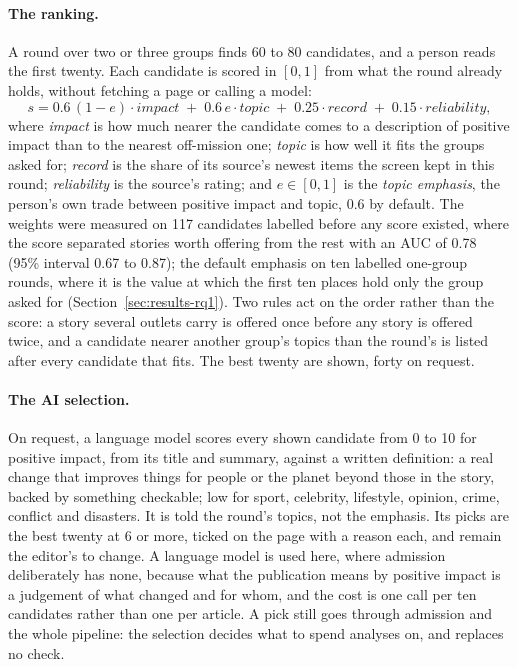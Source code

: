 \paragraph{The ranking.} A round over two or three groups finds 60 to
80 candidates, and a person reads the first twenty. Each candidate is
scored in $[0,1]$ from what the round already holds, without fetching a
page or calling a model:
\[
  s = 0.6\,(1-e)\cdot\textit{impact} \;+\; 0.6\,e\cdot\textit{topic}
      \;+\; 0.25\cdot\textit{record} \;+\; 0.15\cdot\textit{reliability},
\]
where \textit{impact} is how much nearer the candidate comes to a
description of positive impact than to the nearest off-mission one;
\textit{topic} is how well it fits the groups asked for;
\textit{record} is the share of its source's newest items the screen
kept in this round; \textit{reliability} is the source's rating; and
$e \in [0,1]$ is the \emph{topic emphasis}, the person's own trade
between positive impact and topic, 0.6 by default. The weights were
measured on 117 candidates labelled before any score existed, where the
score separated stories worth offering from the rest with an AUC of
0.78 (95\% interval 0.67 to 0.87); the default emphasis on ten labelled
one-group rounds, where it is the value at which the first ten places
hold only the group asked for (Section~\ref{sec:results-rq1}). Two
rules act on the order rather than the score: a story several outlets
carry is offered once before any story is offered twice, and a
candidate nearer another group's topics than the round's is listed
after every candidate that fits. The best twenty are shown, forty on
request.

\paragraph{The AI selection.} On request, a language model scores
every shown candidate from 0 to 10 for positive impact, from its title
and summary, against a written definition: a real change that improves
things for people or the planet beyond those in the story, backed by
something checkable; low for sport, celebrity, lifestyle, opinion,
crime, conflict and disasters. It is told the round's topics, not the
emphasis. Its picks are the best twenty at 6 or more, ticked on the
page with a reason each, and remain the editor's to change. A language
model is used here, where admission deliberately has none, because what
the publication means by positive impact is a judgement of what changed
and for whom, and the cost is one call per ten candidates rather than
one per article. A pick still goes through admission and the whole
pipeline: the selection decides what to spend analyses on, and replaces
no check.

